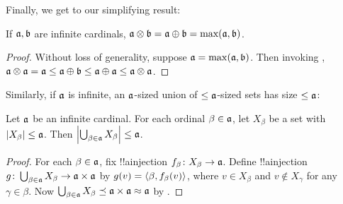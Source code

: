 \documentclass[../../../include/open-logic-section]{subfiles}
\begin{document}
Finally, we get to our simplifying result:

\begin{thm}
If $\mathfrak{a}, \mathfrak{b}$ are infinite cardinals, $\mathfrak{a}
\otimes \mathfrak{b} = \mathfrak{a} \oplus \mathfrak{b} =
\text{max}(\mathfrak{a}, \mathfrak{b})$.
\end{thm}

\begin{proof}
Without loss of generality, suppose $\mathfrak{a} = \max(\mathfrak{a},
\mathfrak{b})$. Then invoking ,
$\mathfrak{a}\otimes\mathfrak{a} = \mathfrak{a} \leq \mathfrak{a}
\oplus \mathfrak{b} \leq \mathfrak{a} \oplus \mathfrak{a} \leq
\mathfrak{a} \otimes \mathfrak{a}$. \end{proof}\noindent Similarly,
if $\mathfrak{a}$ is infinite, an $\mathfrak{a}$-sized union of
$\leq\mathfrak{a}$-sized sets has size $\leq\mathfrak{a}$:

\begin{prop}
Let $\mathfrak{a}$ be an infinite cardinal. For each ordinal $\beta
\in \mathfrak{a}$, let $X_\beta$ be a set with $\left| X_\beta \right| \leq
\mathfrak{a}$. Then $\left| \bigcup_{\beta \in \mathfrak{a}} X_\beta \right|
\leq \mathfrak{a}$.
\end{prop}

\begin{proof}
For each $\beta \in \mathfrak{a}$, fix !!a{injection} $f_\beta \colon
X_\beta \to \mathfrak{a}$. Define !!a{injection} $g \colon
\bigcup_{\beta \in \mathfrak{a}} X_\beta \to \mathfrak{a} \times
\mathfrak{a}$ by $g(v) = \langle \beta, f_\beta(v) \rangle$, where $v \in
X_\beta$ and $v \notin X_\gamma$ for any $\gamma \in \beta$. Now
$\bigcup_{\beta \in \mathfrak{a}} X_\beta \preceq \mathfrak{a} \times
\mathfrak{a} \approx \mathfrak{a}$ by .
\end{proof}
\end{document}
